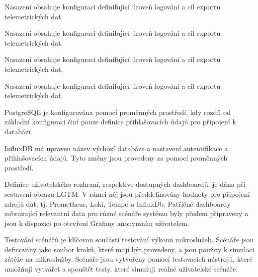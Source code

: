 
Nasazení obsahuje konfiguraci definifující úroveň logování a cíl exportu telemetrických dat.


Nasazení obsahuje konfiguraci definifující úroveň logování a cíl exportu telemetrických dat.


Nasazení obsahuje konfiguraci definifující úroveň logování a cíl exportu telemetrických dat.


Nasazení obsahuje konfiguraci definifující úroveň logování a cíl exportu telemetrických dat.



PostgreSQL je konfigurována pomocí proměnných prostředí, kdy rozdíl od základní konfiguraci činí pouze definice přihlašovacích údajů pro připojení k databázi.


InfluxDB má upraven název výchozí databáze a nastavení autentifikace a přihlašovacích údajů. Tyto změny jsou provedeny za pomocí proměnných prostředí.


Definice uživatelského rozhraní, respektive dostupných dashboardů, je dána při sestavení obrazu LGTM. V rámci něj jsou předdefinovány hodnoty pro připojení zdrojů dat, tj. Prometheus, Loki, Tempo a InfluxDb. Patřičné dashboardy zobrazující relevantní data pro různé scénáře systému byly předem připraveny a jsou k dispozici po otevření Grafany anonymním uživatelem.




Testování scénářů je klíčovou součástí testování výkonu mikroslužeb. Scénáře jsou definovány jako soubor kroků, které mají být provedeny, a jsou použity k simulaci zátěže na mikroslužby. Scénáře jsou vytvořeny pomocí testovacích nástrojů, které umožňují vytvářet a spouštět testy, které simuluji reálné uživatelské scénáře.

